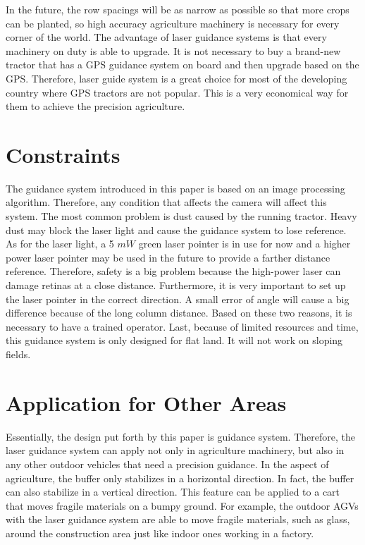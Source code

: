 \documentclass[letterpaper,12pt,oneside]{book}
\begin{document}
		In the future, the row spacings will be as narrow as possible so that more crops can be planted, so high accuracy agriculture machinery is necessary for every corner of the world. The advantage of laser guidance systems is that every machinery on duty is able to upgrade. It is not necessary to buy a brand-new tractor that has a GPS guidance system on board and then upgrade based on the GPS. Therefore, laser guide system is a great choice for most of the developing country where GPS tractors are not popular. This is a very economical way for them to achieve the precision agriculture.
		
		
		\section{Constraints}
		The guidance system introduced in this paper is based on an image processing algorithm. Therefore, any condition that affects the camera will affect this system. The most common problem is dust caused by the running tractor. Heavy dust may block the laser light and cause the guidance system to lose reference. As for the laser light, a 5 $mW$ green laser pointer is in use for now and a higher power laser pointer may be used in the future to provide a farther distance reference. Therefore, safety is a big problem because the high-power laser can damage retinas at a close distance. Furthermore, it is very important to set up the laser pointer in the correct direction. A small error of angle will cause a big difference because of the long column distance. Based on these two reasons, it is necessary to have a trained operator. Last, because of limited resources and time, this guidance system is only designed for flat land. It will not work on sloping fields.
		
		
		\section{Application for Other Areas}
		Essentially, the design put forth by this paper is guidance system. Therefore, the laser guidance system can apply not only in agriculture machinery, but also in any other outdoor vehicles that need a precision guidance. In the aspect of agriculture, the buffer only stabilizes in a horizontal direction. In fact, the buffer can also stabilize in a vertical direction. This feature can be applied to a cart that moves fragile materials on a bumpy ground. For example, the outdoor AGVs with the laser guidance system are able to move fragile materials, such as glass, around the construction area just like indoor ones working in a factory. 
		
\end{document}
